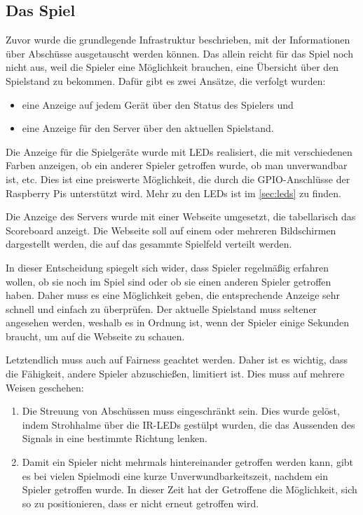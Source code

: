 \subsection{Das Spiel}
\label{sec:architektur-spiel}

Zuvor wurde die grundlegende Infrastruktur beschrieben, mit der Informationen über Abschüsse
ausgetauscht werden können.
Das allein reicht für das Spiel noch nicht aus, weil die Spieler eine Möglichkeit brauchen, eine
Übersicht über den Spielstand zu bekommen.
Dafür gibt es zwei Ansätze, die verfolgt wurden:
\begin{itemize}
  \item
    eine Anzeige auf jedem Gerät über den Status des Spielers und
  \item
    eine Anzeige für den Server über den aktuellen Spielstand.
\end{itemize}
Die Anzeige für die Spielgeräte wurde mit LEDs realisiert, die mit verschiedenen Farben anzeigen, ob
ein anderer Spieler getroffen wurde, ob man unverwandbar ist, etc.
Dies ist eine preiswerte Möglichkeit, die durch die GPIO-Anschlüsse der Raspberry Pis unterstützt
wird.
Mehr zu den LEDs ist im \cref{sec:leds} zu finden.

Die Anzeige des Servers wurde mit einer Webseite umgesetzt, die tabellarisch das Scoreboard anzeigt.
Die Webseite soll auf einem oder mehreren Bildschirmen dargestellt werden, die auf das gesammte
Spielfeld verteilt werden.

In dieser Entscheidung spiegelt sich wider, dass Spieler regelmäßig erfahren wollen, ob sie noch im
Spiel sind oder ob sie einen anderen Spieler getroffen haben.
Daher muss es eine Möglichkeit geben, die entsprechende Anzeige sehr schnell und einfach zu
überprüfen.
Der aktuelle Spielstand muss seltener angesehen werden, weshalb es in Ordnung ist, wenn der Spieler
einige Sekunden braucht, um auf die Webseite zu schauen.

Letztendlich muss auch auf Fairness geachtet werden.
Daher ist es wichtig, dass die Fähigkeit, andere Spieler abzuschießen, limitiert ist.
Dies muss auf mehrere Weisen geschehen:
\newpage
\begin{enumerate}
  \item
    Die Streuung von Abschüssen muss eingeschränkt sein.
    Dies wurde gelöst, indem Strohhalme über die IR-LEDs gestülpt wurden, die das Aussenden des
    Signals in eine bestimmte Richtung lenken.
  \item
    Damit ein Spieler nicht mehrmals hintereinander getroffen werden kann, gibt es bei vielen
    Spielmodi eine kurze Unverwundbarkeitszeit, nachdem ein Spieler getroffen wurde.
    In dieser Zeit hat der Getroffene die Möglichkeit, sich so zu positionieren, dass er nicht
    erneut getroffen wird.
\end{enumerate}

